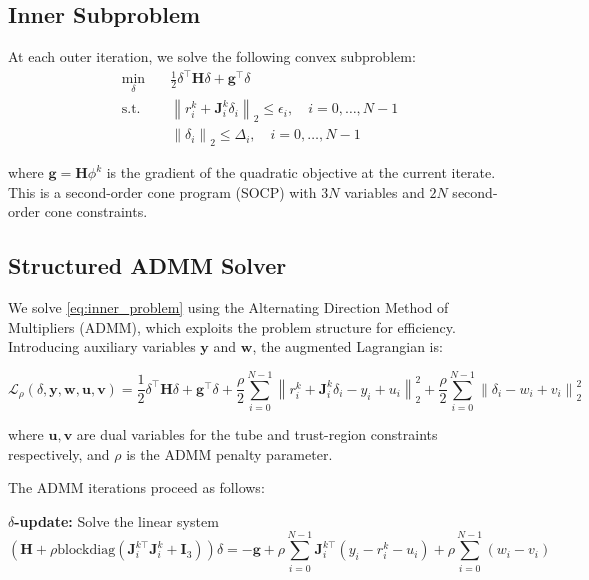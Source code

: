 \subsection{Inner Subproblem}

At each outer iteration, we solve the following convex subproblem:
\begin{equation}
\label{eq:inner_problem}
\begin{aligned}
\min_{\delta} \quad & \frac{1}{2}\delta^\top \mathbf{H}\delta + \mathbf{g}^\top \delta \\
\text{s.t.} \quad & \left\| r_i^k + \mathbf{J}_i^k \delta_i \right\|_2 \leq \epsilon_i, \quad i = 0,\ldots,N-1 \\
& \left\| \delta_i \right\|_2 \leq \Delta_i, \quad i = 0,\ldots,N-1
\end{aligned}
\end{equation}

where $\mathbf{g} = \mathbf{H}\phi^k$ is the gradient of the quadratic objective at the current iterate. This is a second-order cone program (SOCP) with $3N$ variables and $2N$ second-order cone constraints.

\subsection{Structured ADMM Solver}

We solve \eqref{eq:inner_problem} using the Alternating Direction Method of Multipliers (ADMM), which exploits the problem structure for efficiency. Introducing auxiliary variables $\mathbf{y}$ and $\mathbf{w}$, the augmented Lagrangian is:

\begin{equation}
\label{eq:augmented_lagrangian}
\mathcal{L}_\rho(\delta, \mathbf{y}, \mathbf{w}, \mathbf{u}, \mathbf{v}) = \frac{1}{2}\delta^\top \mathbf{H}\delta + \mathbf{g}^\top \delta + \frac{\rho}{2}\sum_{i=0}^{N-1} \left\| r_i^k + \mathbf{J}_i^k \delta_i - y_i + u_i \right\|_2^2 + \frac{\rho}{2}\sum_{i=0}^{N-1} \left\| \delta_i - w_i + v_i \right\|_2^2
\end{equation}

where $\mathbf{u}, \mathbf{v}$ are dual variables for the tube and trust-region constraints respectively, and $\rho$ is the ADMM penalty parameter.

The ADMM iterations proceed as follows:

\textbf{$\delta$-update:} Solve the linear system
\begin{equation}
\label{eq:delta_update}
(\mathbf{H} + \rho \text{blockdiag}(\mathbf{J}_i^{k\top} \mathbf{J}_i^k + \mathbf{I}_3))\delta = -\mathbf{g} + \rho \sum_{i=0}^{N-1} \mathbf{J}_i^{k\top}(y_i - r_i^k - u_i) + \rho \sum_{i=0}^{N-1} (w_i - v_i)
\end{equation}

